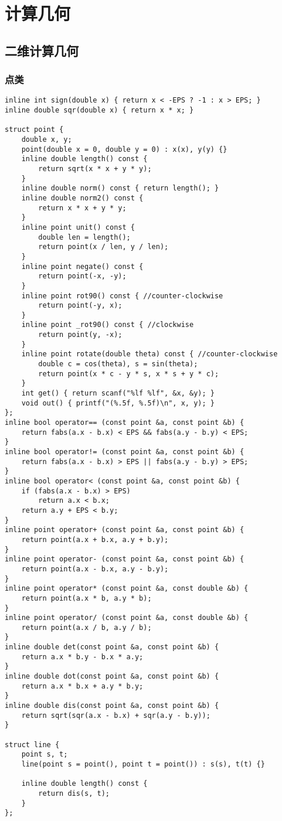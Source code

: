 \documentclass{article}
\begin{document}
\section{计算几何}

\subsection{二维计算几何}

\subsubsection{点类}

\begin{lstlisting}
inline int sign(double x) { return x < -EPS ? -1 : x > EPS; }
inline double sqr(double x) { return x * x; }

struct point {
    double x, y;
    point(double x = 0, double y = 0) : x(x), y(y) {}
    inline double length() const {
        return sqrt(x * x + y * y);
    }
    inline double norm() const { return length(); }
    inline double norm2() const {
        return x * x + y * y;
    }
    inline point unit() const {
        double len = length();
        return point(x / len, y / len);
    }
    inline point negate() const {
        return point(-x, -y);
    }
    inline point rot90() const { //counter-clockwise
        return point(-y, x);
    }
    inline point _rot90() const { //clockwise
        return point(y, -x);
    }
    inline point rotate(double theta) const { //counter-clockwise
        double c = cos(theta), s = sin(theta);
        return point(x * c - y * s, x * s + y * c);
    }
    int get() { return scanf("%lf %lf", &x, &y); }
    void out() { printf("(%.5f, %.5f)\n", x, y); }
};
inline bool operator== (const point &a, const point &b) {
    return fabs(a.x - b.x) < EPS && fabs(a.y - b.y) < EPS;
}
inline bool operator!= (const point &a, const point &b) {
    return fabs(a.x - b.x) > EPS || fabs(a.y - b.y) > EPS;
}
inline bool operator< (const point &a, const point &b) {
    if (fabs(a.x - b.x) > EPS)
        return a.x < b.x;
    return a.y + EPS < b.y;
}
inline point operator+ (const point &a, const point &b) {
    return point(a.x + b.x, a.y + b.y);
}
inline point operator- (const point &a, const point &b) {
    return point(a.x - b.x, a.y - b.y);
}
inline point operator* (const point &a, const double &b) {
    return point(a.x * b, a.y * b);
}
inline point operator/ (const point &a, const double &b) {
    return point(a.x / b, a.y / b);
}
inline double det(const point &a, const point &b) {
    return a.x * b.y - b.x * a.y;
}
inline double dot(const point &a, const point &b) {
    return a.x * b.x + a.y * b.y;
}
inline double dis(const point &a, const point &b) {
    return sqrt(sqr(a.x - b.x) + sqr(a.y - b.y));
}

struct line {
    point s, t;
    line(point s = point(), point t = point()) : s(s), t(t) {}

    inline double length() const {
        return dis(s, t);
    }
};
\end{lstlisting}
\end{document}
